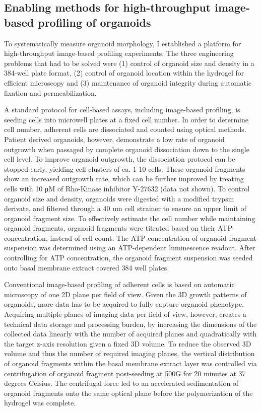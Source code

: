 \begin{flushleft}
\section{Enabling methods for high-throughput image-based profiling of organoids}
To systematically measure organoid morphology, I established a platform for high-throughput image-based profiling experiments. The three engineering problems that had to be solved were (1) control of organoid size and density in a 384-well plate format, (2) control of organoid location within the hydrogel for efficient microscopy and (3) maintenance of organoid integrity during automatic fixation and permeabilization. 

\bigbreak

A standard protocol for cell-based assays, including image-based profiling, is seeding cells into microwell plates at a fixed cell number. In order to determine cell number, adherent cells are dissociated and counted using optical methods. Patient derived organoids, however, demonstrate a low rate of organoid outgrowth when passaged by complete organoid dissociation down to the single cell level. To improve organoid outgrowth, the dissociation protocol can be stopped early, yielding cell clusters of ca. 1-10 cells. These organoid fragments show an increased outgrowth rate, which can be further improved by treating cells with 10 μM of Rho-Kinase inhibitor Y-27632 (data not shown). To control organoid size and density, organoids were digested with a modified trypsin derivate, and filtered through a 40 um cell strainer to ensure an upper limit of organoid fragment size. To effectively estimate the cell number while maintaining organoid fragments, organoid fragments were titrated based on their ATP concentration, instead of cell count. The ATP concentration of organoid fragment suspension was determined using an ATP-dependent luminescence readout. After controlling for ATP concentration, the organoid fragment suspension was seeded onto basal membrane extract covered 384 well plates.

\bigbreak

Conventional image-based profiling of adherent cells is based on automatic microscopy of one 2D plane per field of view. Given the 3D growth patterns of organoids, more data has to be acquired to fully capture organoid phenotype. Acquiring multiple planes of imaging data per field of view, however, creates a technical data storage and processing burden, by increasing the dimensions of the collected data linearly with the number of acquired planes and quadratically with the target z-axis resolution given a fixed 3D volume. To reduce the observed 3D volume and thus the number of required imaging planes, the vertical distribution of organoid fragments within the basal membrane extract layer was controlled via centrifugation of organoid fragment post-seeding at 500G for 20 minutes at 37 degrees Celsius. The centrifugal force led to an accelerated sedimentation of organoid fragments onto the same optical plane before the polymerization of the hydrogel was complete.


\end{flushleft}
